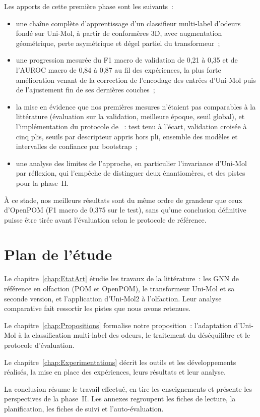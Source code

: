 Les apports de cette première phase sont les suivants~:
\begin{itemize}
   \item une chaîne complète d'apprentissage d'un classifieur multi-label d'odeurs fondé sur Uni-Mol, à partir de conformères 3D, avec augmentation géométrique, perte asymétrique \cite{Ridnik-2021} et dégel partiel du transformeur~;
   \item une progression mesurée du F1 macro de validation de 0,21 à 0,35 et de l'AUROC macro de 0,84 à 0,87 au fil des expériences, la plus forte amélioration venant de la correction de l'encodage des entrées d'Uni-Mol puis de l'ajustement fin de ses dernières couches~;
   \item la mise en évidence que nos premières mesures n'étaient pas comparables à la littérature (évaluation sur la validation, meilleure époque, seuil global), et l'implémentation du protocole de \cite{Han-2026}~: test tenu à l'écart, validation croisée à cinq plis, seuils par descripteur appris hors pli, ensemble des modèles et intervalles de confiance par bootstrap~;
   \item une analyse des limites de l'approche, en particulier l'invariance d'Uni-Mol par réflexion, qui l'empêche de distinguer deux énantiomères, et des pistes pour la phase~II.
\end{itemize}

À ce stade, nos meilleurs résultats sont du même ordre de grandeur que ceux d'OpenPOM (F1 macro de 0,375 sur le test), sans qu'une conclusion définitive puisse être tirée avant l'évaluation selon le protocole de référence.


\section{Plan de l'étude}
\label{sec:Plan}

Le chapitre~\ref{chap:EtatArt} étudie les travaux de la littérature~: les GNN de référence en olfaction (POM et OpenPOM), le transformeur Uni-Mol et sa seconde version, et l'application d'Uni-Mol2 à l'olfaction.
Leur analyse comparative fait ressortir les pistes que nous avons retenues.

Le chapitre~\ref{chap:Propositions} formalise notre proposition~: l'adaptation d'Uni-Mol à la classification multi-label des odeurs, le traitement du déséquilibre et le protocole d'évaluation.

Le chapitre~\ref{chap:Experimentations} décrit les outils et les développements réalisés, la mise en place des expériences, leurs résultats et leur analyse.

La conclusion résume le travail effectué, en tire les enseignements et présente les perspectives de la phase~II.
Les annexes regroupent les fiches de lecture, la planification, les fiches de suivi et l'auto-évaluation.
